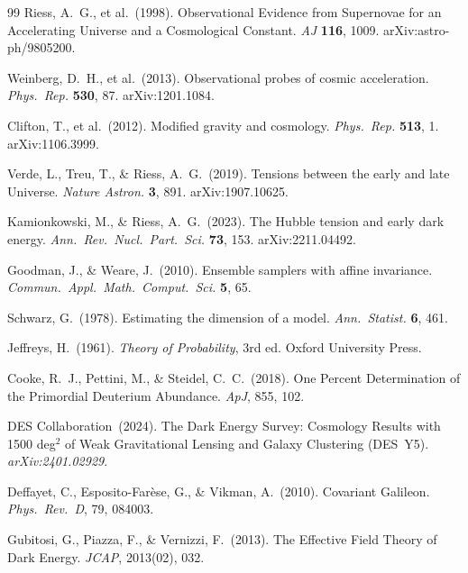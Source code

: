 \documentclass[12pt,a4paper]{article}
\begin{document}
\begin{thebibliography}{99}
Riess, A.~G., et al.\ (1998).
Observational Evidence from Supernovae for an Accelerating Universe and a Cosmological Constant.
\textit{AJ} \textbf{116}, 1009. arXiv:astro-ph/9805200.

Weinberg, D.~H., et al.\ (2013).
Observational probes of cosmic acceleration.
\textit{Phys.\ Rep.} \textbf{530}, 87. arXiv:1201.1084.

Clifton, T., et al.\ (2012).
Modified gravity and cosmology.
\textit{Phys.\ Rep.} \textbf{513}, 1. arXiv:1106.3999.

Verde, L., Treu, T., \& Riess, A.~G.\ (2019).
Tensions between the early and late Universe.
\textit{Nature Astron.} \textbf{3}, 891. arXiv:1907.10625.

Kamionkowski, M., \& Riess, A.~G.\ (2023).
The Hubble tension and early dark energy.
\textit{Ann.\ Rev.\ Nucl.\ Part.\ Sci.} \textbf{73}, 153. arXiv:2211.04492.

Goodman, J., \& Weare, J.\ (2010).
Ensemble samplers with affine invariance.
\textit{Commun.\ Appl.\ Math.\ Comput.\ Sci.} \textbf{5}, 65.

Schwarz, G.\ (1978).
Estimating the dimension of a model.
\textit{Ann.\ Statist.} \textbf{6}, 461.

Jeffreys, H.\ (1961).
\textit{Theory of Probability}, 3rd ed.
Oxford University Press.

Cooke, R.~J., Pettini, M., \& Steidel, C.~C.\ (2018).
One Percent Determination of the Primordial Deuterium Abundance.
\textit{ApJ}, 855, 102.

DES Collaboration\ (2024).
The Dark Energy Survey: Cosmology Results with 1500 deg$^2$ of Weak Gravitational Lensing and Galaxy Clustering (DES~Y5).
\textit{arXiv:2401.02929}.

Deffayet, C., Esposito-Farèse, G., \& Vikman, A.\ (2010).
Covariant Galileon.
\textit{Phys.~Rev.~D}, 79, 084003.

Gubitosi, G., Piazza, F., \& Vernizzi, F.\ (2013).
The Effective Field Theory of Dark Energy.
\textit{JCAP}, 2013(02), 032.


\end{thebibliography}
\end{document}
